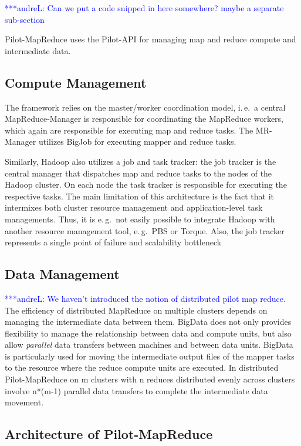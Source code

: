 \documentclass{acm_proc_article-sp}
\newcommand{\alnote}[1]{ {\textcolor{blue} { ***andreL: #1 }}}
\newcommand{\alnote}[1]{}
\newcommand{\pilotmapreduce}{Pilot-MapReduce\xspace}
\begin{document}
\alnote{Can we put a code snipped in here somewhere? maybe a separate sub-section}

\pilotmapreduce uses the Pilot-API for managing map and reduce compute and intermediate data.


\subsection{Compute Management}
The framework relies on the master/worker
coordination model, i.\,e.\ a central MapReduce-Manager is responsible for
coordinating the MapReduce workers, which again are responsible for executing
map and reduce tasks. The MR-Manager utilizes BigJob for executing
mapper and reduce tasks. 

Similarly, Hadoop also utilizes a job and task tracker: the job tracker is the
central manager that dispatches map and reduce tasks to the nodes of the
Hadoop cluster. On each node the task tracker is responsible for executing the
respective tasks. The main limitation of this architecture is the fact that it
intermixes both cluster resource management and application-level task
managements. Thus, it is e.\,g.\ not easily possible to integrate Hadoop with
another resource management tool, e.\,g.\ PBS or Torque. Also, the job tracker
represents a single point of failure and scalability bottleneck

\subsection{Data Management}
\alnote{We haven't introduced the notion of distributed pilot map reduce.}
The efficiency of distributed MapReduce on multiple clusters depends on managing the
intermediate data between them. BigData does not only provides flexibility to manage the
relationship between data and compute units, but also allow {\it parallel} data transfers
between machines and between data units. BigData is particularly used for moving the
intermediate output files of the mapper tasks to the resource where the reduce compute
units are executed. In distributed \pilotmapreduce on m clusters with n reduces distributed
evenly across clusters involve n*(m-1) parallel data transfers to complete the intermediate
data movement.


\subsection{Architecture of Pilot-MapReduce}
\end{document}

